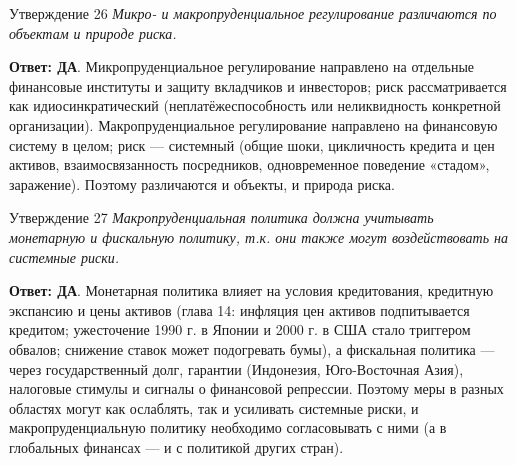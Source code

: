 \documentclass[10pt,a4paper]{article}
\newcommand{\qda}{\textbf{\color{yesgreen}Ответ: ДА}}
\newenvironment{answer}[2]{%
  \begin{qbox}{Утверждение #1}
  \textit{#2}\par\smallskip
}{%
  \end{qbox}\vspace{2pt}
}
\begin{document}
\begin{answer}{26}{Микро- и макропруденциальное регулирование различаются по объектам и природе риска.}
\qda. Микропруденциальное регулирование направлено на отдельные финансовые институты и защиту вкладчиков и инвесторов; риск рассматривается как идиосинкратический (неплатёжеспособность или неликвидность конкретной организации). Макропруденциальное регулирование направлено на финансовую систему в целом; риск --- системный (общие шоки, цикличность кредита и цен активов, взаимосвязанность посредников, одновременное поведение «стадом», заражение). Поэтому различаются и объекты, и природа риска. 
\end{answer}

\begin{answer}{27}{Макропруденциальная политика должна учитывать монетарную и фискальную политику, т.к. они также могут воздействовать на системные риски.}
\qda. Монетарная политика влияет на условия кредитования, кредитную экспансию и цены активов (глава 14: инфляция цен активов подпитывается кредитом; ужесточение 1990 г. в Японии и 2000 г. в США стало триггером обвалов; снижение ставок может подогревать бумы), а фискальная политика --- через государственный долг, гарантии (Индонезия, Юго-Восточная Азия), налоговые стимулы и сигналы о финансовой репрессии. Поэтому меры в разных областях могут как ослаблять, так и усиливать системные риски, и макропруденциальную политику необходимо согласовывать с ними (а в глобальных финансах --- и с политикой других стран).
\end{answer}
\end{document}
